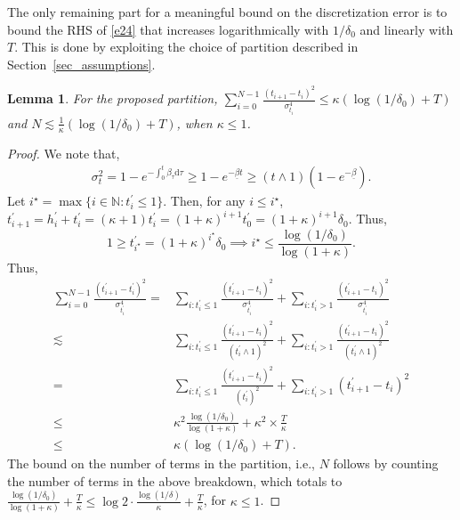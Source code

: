 \documentclass[12pts]{article}
\newtheorem{lemma}[defn]{Lemma}%
\newcommand{\diff}{\mathrm{d}}
\newcommand{\fN}{\mathbb{N}}
\begin{document}
The only remaining part for a meaningful bound on the discretization error is to bound the RHS of \eqref{e24} that increases logarithmically with $1/\delta_0$ and linearly with $T$.  This is done by exploiting the choice of partition described in Section~\ref{sec_assumptions}.
\begin{lemma}\label{lem5}
    For the proposed partition, \(\sum_{i=0}^{N-1} \frac{(t_{i+1} - t_i)^2}{\sigma^4_{t_i}}  \le \kappa \left(\log(1/\delta_0) + T \right)\) and $N \lesssim \frac{1}{\kappa} \left(\log(1/\delta_0) + T \right)$, when $\kappa \le 1$.
\end{lemma}
\begin{proof}
We note that,
\begingroup
\allowdisplaybreaks
\begin{align*}
    \sigma^2_{t} = 1 -e^{- \int_0^t \beta_\tau \diff  \tau} \ge 1-e^{-\underline{\beta} t} \ge (t \wedge 1) \left(1-e^{-\underline{\beta}}\right).
\end{align*}
Let $i^\star = \max\{i \in \fN : t^\prime_i \le 1\} $. Then, for any $i \le i^\star$, $t^\prime_{i+1} = h^\prime_i + t^\prime_i = (\kappa+1) t^\prime_i = (1+\kappa)^{i+1} t^\prime_0 = (1+\kappa)^{i+1} \delta_0$. Thus,
\[1 \ge t^\prime_{i^\star} = (1+\kappa)^{i^\star} \delta_0 \implies i^\star \le \frac{\log(1/\delta_0)}{\log(1+\kappa)}.\]
Thus,
\begin{align}
    \sum_{i=0}^{N-1} \frac{(t_{i+1}^\prime - t_i^\prime)^2}{\sigma^4_{t_i^\prime}} 
    = & \sum_{i: t_i^\prime \le 1}\frac{(t_{i+1}^\prime - t_i)^2}{\sigma^4_{t_i^\prime}} + \sum_{i: t_i^\prime > 1}\frac{(t_{i+1}^\prime - t_i)^2}{\sigma^4_{t_i^\prime}} \nonumber\\
    \lesssim & \sum_{i: t_i^\prime \le 1}\frac{(t_{i+1}^\prime - t_i)^2}{(t_i^\prime\wedge 1)^2} + \sum_{i: t_i^\prime > 1}\frac{(t_{i+1}^\prime - t_i)^2}{(t_i^\prime\wedge 1)^2} \nonumber\\
    = & \sum_{i: t_i^\prime \le 1} \frac{(t_{i+1}^\prime - t_i)^2}{(t_i^\prime)^2} + \sum_{i: t_i^\prime > 1} (t_{i+1}^\prime - t_i)^2 \nonumber\\
    \le & \kappa^2 \frac{\log(1/\delta_0)}{\log(1+\kappa)} + \kappa^2 \times \frac{T}{\kappa} \nonumber\\
    \le & \kappa \left(\log(1/\delta_0) + T \right). \label{e25}
\end{align}
\endgroup
The bound on the number of terms in the partition, i.e., $N$ follows by counting the number of terms in the above breakdown, which totals to $\frac{\log(1/\delta_0)}{\log(1+\kappa)} + \frac{T}{\kappa} \le \log 2 \cdot  \frac{\log(1/\delta)}{\kappa} + \frac{T}{\kappa}$, for $\kappa \le 1$.
\end{proof}
\end{document}
